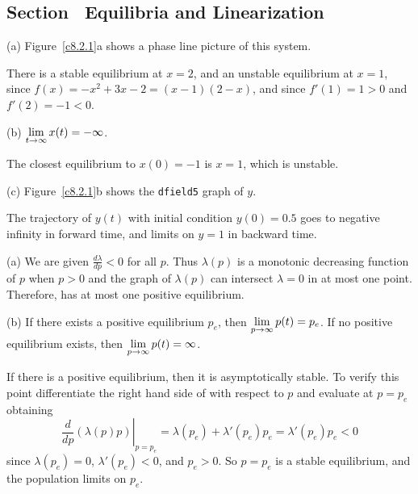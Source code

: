 \documentclass{ximera}
\begin{document}
\subsection*{Section~\protect{\ref{S:linearization}} Equilibria and Linearization}

(a) \ans Figure~\ref{c8.2.1}a shows a phase line picture
of this system.

\soln There is a stable equilibrium at $x = 2$, and an unstable
equilibrium at $x = 1$, since $f(x) = -x^2 + 3x - 2 = (x - 1)(2 - x)$,
and since $f'(1) = 1 > 0$ and $f'(2) = -1 < 0$.

(b) \ans $\displaystyle\lim_{t \to \infty} x(t) = -\infty$.

\soln The closest equilibrium to $x(0) = -1$ is $x = 1$, which is
unstable. 

(c) \ans Figure~\ref{c8.2.1}b shows the {\tt dfield5} graph of $y$.

\soln The trajectory of $y(t)$ with initial condition $y(0) = 0.5$ goes
to negative infinity in forward time, and limits on $y = 1$ in
backward time.

\begin{figure}[htb]
                       \centerline{%
                       }
\end{figure}

(a) We are given $\frac{d\lambda}{dp} < 0$ for all $p$.  Thus $\lambda(p)$ is a 
monotonic decreasing function of $p$ when $p>0$ and the graph of 
$\lambda(p)$ can intersect $\lambda=0$ in at most one point.
Therefore,  has at most one positive equilibrium.

(b) \ans If there exists a positive equilibrium $p_e$, then
$\displaystyle\lim_{p \to \infty} p(t) = p_e$.  If no positive equilibrium
exists, then $\displaystyle\lim_{p \to \infty} p(t) = \infty$.

\soln If there is a positive equilibrium, then it is asymptotically stable.
To verify this point differentiate the right hand side of  with respect to 
$p$ and evaluate at $p=p_e$ obtaining
\[
\left.\frac{d}{dp}(\lambda(p)p)\right|_{p=p_e} = 
\lambda(p_e) + \lambda'(p_e)p_e = \lambda'(p_e)p_e <0
\]
since $\lambda(p_e) = 0$, $\lambda'(p_e) < 0$, and $p_e > 0$.  
So $p = p_e$ is a stable equilibrium, and the population limits on
$p_e$.
\end{document}
